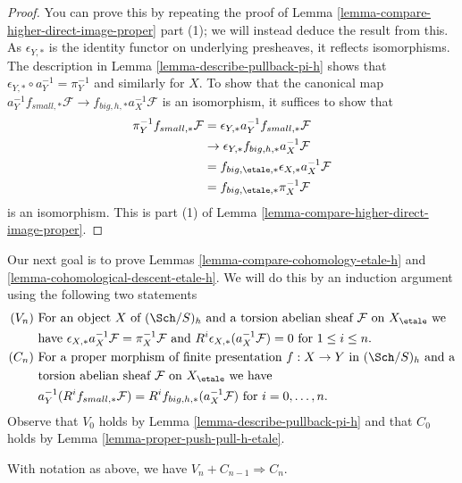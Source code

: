\begin{proof}
You can prove this by repeating the proof of
Lemma \ref{lemma-compare-higher-direct-image-proper} part (1);
we will instead deduce the result from this.
As $\epsilon_{Y, *}$ is the identity functor on underlying presheaves,
it reflects isomorphisms. The description
in Lemma \ref{lemma-describe-pullback-pi-h}
shows that $\epsilon_{Y, *} \circ a_Y^{-1} = \pi_Y^{-1}$
and similarly for $X$. To show that the canonical map
$a_Y^{-1}f_{small, *}\mathcal{F} \to f_{big, h, *}a_X^{-1}\mathcal{F}$
is an isomorphism, it suffices to show that
\begin{align*}
\pi_Y^{-1}f_{small, *}\mathcal{F}
& =
\epsilon_{Y, *}a_Y^{-1}f_{small, *}\mathcal{F} \\
& \to 
\epsilon_{Y, *}f_{big, h, *}a_X^{-1}\mathcal{F} \\
& =
f_{big, \etale, *} \epsilon_{X, *}a_X^{-1}\mathcal{F} \\
& =
f_{big, \etale, *}\pi_X^{-1}\mathcal{F}
\end{align*}
is an isomorphism. This is part
(1) of Lemma \ref{lemma-compare-higher-direct-image-proper}.
\end{proof}

\noindent
Our next goal is to prove Lemmas \ref{lemma-compare-cohomology-etale-h} and
\ref{lemma-cohomological-descent-etale-h}. We will do this by an induction
argument using the following two statements
\begin{align*}
(V_n) &
\text{ For an object }X
\text{ of }(\Sch/S)_h
\text{ and a torsion abelian sheaf }\mathcal{F}
\text{ on }X_\etale
\text{ we}\\
&
\text{ have }\epsilon_{X, *}a_X^{-1}\mathcal{F} = \pi_X^{-1}\mathcal{F}
\text{ and }R^i\epsilon_{X, *}(a_X^{-1}\mathcal{F}) = 0
\text{ for }1 \leq i \leq n.\\
(C_n) &
\text{ For a proper morphism of finite presentation }f : X \to Y
\text{ in }(\Sch/S)_h
\text{ and a}\\
&
\text{ torsion abelian sheaf }\mathcal{F}
\text{ on }X_\etale
\text{ we have}\\
&
\text{ }a_Y^{-1}(R^if_{small, *}\mathcal{F}) =
R^if_{big, h, *}(a_X^{-1}\mathcal{F})
\text{ for }i = 0, \ldots, n.
\end{align*}
Observe that $V_0$ holds by Lemma \ref{lemma-describe-pullback-pi-h}
and that $C_0$ holds by
Lemma \ref{lemma-proper-push-pull-h-etale}.

\begin{lemma}
\label{lemma-V-implies-C-etale-h}
With notation as above, we have $V_n + C_{n - 1} \Rightarrow C_n$.
\end{lemma}

